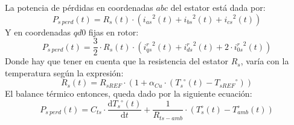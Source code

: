 \documentclass[10pt]{article}
\begin{document}
\begin{enumerate}
\begin{itemize}
		La potencia de pérdidas en coordenadas $abc$ del estator está dada por:
		\begin{equation}
			P_{s\ perd}\left ( t \right )=R_{s}\left ( t \right )\cdot \left ( {i_{as}}^{2}\left ( t \right )+{i_{bs}}^{2}\left ( t \right )+{i_{cs}}^{2}\left ( t \right ) \right )
		\end{equation}
		Y en coordenadas $qd0$ fijas en rotor:
		\begin{equation}
			\label{eqn:potenciaDisipada}
			P_{s\ perd}\left ( t \right )=\frac{3}{2}\cdot R_{s}\left ( t \right )\cdot \left ( {i_{qs}^{r}}^{2}\left ( t \right )+{i_{ds}^{r}}^{2}\left ( t \right )+2\cdot {i_{0s}^{r}}^{2}\left ( t \right ) \right )
		\end{equation}
		Donde hay que tener en cuenta que la resistencia del estator $R_{s}$, varía con la temperatura según la expresión:
		\begin{equation}
			\label{eqn:variacionRs}
			R_{s}\left ( t \right )=R_{sREF}\cdot \left ( 1+\alpha_{Cu}\cdot \left ( {T_{s}}^{\circ}\left ( t \right )-{T_{sREF}}^{\circ} \right ) \right )
		\end{equation}
		El balance térmico entonces, queda dado por la siguiente ecuación:
		\begin{equation}
			\label{eqn:balanceTermico}
			P_{s\ perd}\left ( t \right )=C_{ts}\cdot \frac{\mathrm{d} {T_{s}}^{\circ}\left ( t \right )}{\mathrm{d} t}+\frac{1}{R_{ts-amb}}\cdot \left ( T_{s}^{\circ}\left ( t \right )-T_{amb}^{\circ}\left ( t \right ) \right )
		\end{equation}


\end{itemize}
\end{enumerate}
\end{document}
